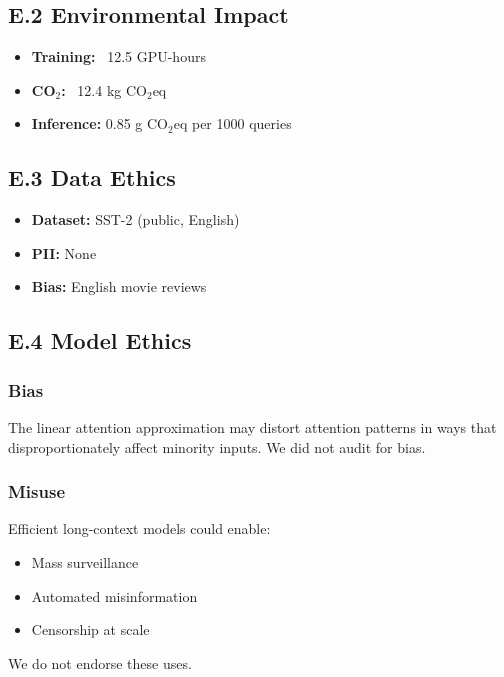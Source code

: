 \subsection{E.2 Environmental Impact}

\begin{itemize}
\item \textbf{Training:} ~12.5 GPU-hours
\item \textbf{CO$_2$:} ~12.4 kg CO$_2$eq
\item \textbf{Inference:} 0.85 g CO$_2$eq per 1000 queries

\end{itemize}
\subsection{E.3 Data Ethics}

\begin{itemize}
\item \textbf{Dataset:} SST-2 (public, English)
\item \textbf{PII:} None
\item \textbf{Bias:} English movie reviews

\end{itemize}
\subsection{E.4 Model Ethics}

\subsubsection{Bias}

The linear attention approximation may distort attention patterns in ways 
that disproportionately affect minority inputs. We did not audit for bias.

\subsubsection{Misuse}

Efficient long-context models could enable:

\begin{itemize}
\item Mass surveillance
\item Automated misinformation
\item Censorship at scale

\end{itemize}
We do not endorse these uses.

